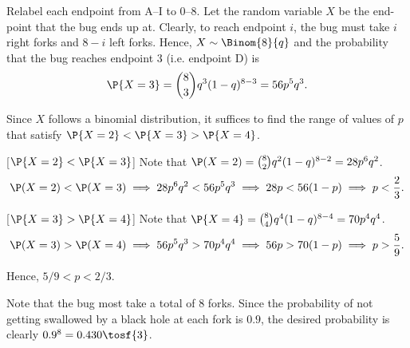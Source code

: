 \begin{solution}
    \begin{ppart}
        Relabel each endpoint from A--I to 0--8. Let the random variable $X$ be the end-point that the bug ends up at. Clearly, to reach endpoint $i$, the bug must take $i$ right forks and $8-i$ left forks. Hence, $X \sim \Binom{8}{q}$ and the probability that the bug reaches endpoint 3 (i.e. endpoint D) is \[\P{X = 3} = \binom{8}{3} q^3 (1-q)^{8-3} = 56p^5q^3.\]
    \end{ppart}
    \begin{ppart}
        Since $X$ follows a binomial distribution, it suffices to find the range of values of $p$ that satisfy $\P{X = 2} < \P{X = 3} > \P{X = 4}$.
        
        [$\P{X = 2} < \P{X = 3}$] Note that $\P(X = 2) = \binom{8}{2} q^2 (1-q)^{8-2} = 28p^6q^2$. \[\P(X = 2) < \P(X = 3) \implies 28p^6q^2 < 56p^5q^3 \implies 28p < 56(1-p) \implies p < \frac23.\]

        [$\P{X = 3} > \P{X = 4}$] Note that $\P{X = 4} = \binom{8}{4} q^4 (1 - q)^{8-4} = 70 p^4 q^4$. \[\P(X = 3) > \P(X = 4) \implies 56p^5q^3 > 70p^4q^4 \implies 56p > 70(1-p) \implies p > \frac59.\]

        Hence, $5/9 < p < 2/3$.
    \end{ppart}
    \begin{ppart}
        Note that the bug most take a total of 8 forks. Since the probability of not getting swallowed by a black hole at each fork is $0.9$, the desired probability is clearly $0.9^8 = 0.430 \tosf{3}$.
    \end{ppart}
\end{solution}

